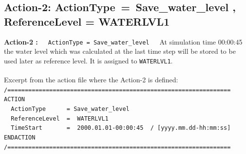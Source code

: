 \newpage
\subsection{Action-2: ActionType\, = \,Save\_water\_level , ReferenceLevel = WATERLVL1}
\label{ssec:E4Action2}
\textbf{Action-2 :}~~~\texttt{ActionType\,=\,Save\_water\_level}~~~At simulation time 00:00:45 the water
level which was calculated at the last time step will be stored to be used later as reference level.
It is assigned to \texttt{WATERLVL1}.
\\
\\
Excerpt from the action file where the Action-2 is defined:
\\ \hspace*{3mm} \texttt{\small{/================================================================}}
\\ \hspace*{3mm} \texttt{\small{ACTION}}
\\ \hspace*{3mm} \texttt{\small{~~ActionType~~~~~~=~Save\_water\_level}}
\\ \hspace*{3mm} \texttt{\small{~~ReferenceLevel~~=~~WATERLVL1}}
\\ \hspace*{3mm} \texttt{\small{~~TimeStart~~~~~~~=~~2000.01.01-00:00:45~~/~[yyyy.mm.dd-hh:mm:ss]}}
\\ \hspace*{3mm} \texttt{\small{ENDACTION}}
\\ \hspace*{3mm} \texttt{\small{/================================================================}}
\\
\\
\\
